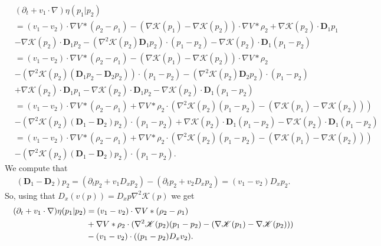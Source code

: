 \documentclass[11pt,reqno]{amsart}
\numberwithin{equation}{section}
\begin{document}
\begin{align*}
&(\partial_{t}+v_{1}\cdot \nabla)\eta(p_{1}\vert p_{2})\\
&=(v_{1}-v_{2})\cdot\nabla V\ast (\rho_{2}-\rho_{1})-(\nabla\mathscr{K}(p_{1})-\nabla\mathscr{K}(p_{2}))\cdot\nabla V\ast \rho_{2}+\nabla\mathscr{K}(p_{2})\cdot\mathbf{D}_{1}p_{1}\\
&-\nabla\mathscr{K}(p_{2})\cdot \mathbf{D}_{1}p_{2}-(\nabla^{2}\mathscr{K}(p_{2})\mathbf{D}_{1}p_{2})\cdot(p_{1}-p_{2})-\nabla\mathscr{K}(p_{2})\cdot \mathbf{D}_{1}(p_{1}-p_{2})\\
&=(v_{1}-v_{2})\cdot \nabla V\ast (\rho_{2}-\rho_{1})-(\nabla\mathscr{K}(p_{1})-\nabla\mathscr{K}(p_{2}))\cdot \nabla V\ast \rho_{2}\\
&-(\nabla^{2}\mathscr{K}(p_{2})(\mathbf{D}_{1}p_{2}-\mathbf{D}_{2}p_{2}))\cdot (p_{1}-p_{2})-(\nabla^{2}\mathscr{K}(p_{2})\mathbf{D}_{2}p_{2})\cdot (p_{1}-p_{2})\\
&+\nabla\mathscr{K}(p_{2})\cdot\mathbf{D}_{1}p_{1}-\nabla\mathscr{K}(p_{2})\cdot \mathbf{D}_{1}p_{2}-\nabla\mathscr{K}(p_{2})\cdot \mathbf{D}_{1}(p_{1}-p_{2})\\
&=(v_{1}-v_{2})\cdot\nabla V\ast (\rho_{2}-\rho_{1})+\nabla V\ast \rho_{2}\cdot \left(\nabla^{2}\mathscr{K}(p_{2})(p_{1}-p_{2})-(\nabla\mathscr{K}(p_{1})-\nabla\mathscr{K}(p_{2}))\right)\\
&-
(\nabla^{2}\mathscr{K}(p_{2})(\mathbf{D}_{1}-\mathbf{D}_{2})p_{2})\cdot (p_{1}-p_{2})+\nabla \mathscr{K}(p_{2})\cdot \mathbf{D}_{1}(p_{1}-p_{2})-\nabla \mathscr{K}(p_{2})\cdot \mathbf{D}_{1}(p_{1}-p_{2})\\
&=(v_{1}-v_{2})\cdot \nabla V\ast (\rho_{2}-\rho_{1})+\nabla V\ast \rho_{2}\cdot (\nabla^{2}\mathscr{K}(p_{2})(p_{1}-p_{2})-(\nabla \mathscr{K}(p_{1})-\nabla \mathscr{K}(p_{2})))\\
&-(\nabla^{2} \mathscr{K}(p_{2})(\mathbf{D}_{1}-\mathbf{D}_{2})p_{2})\cdot (p_{1}-p_{2}). 
\end{align*}
We compute that 
\begin{align*}
(\mathbf{D}_{1}-\mathbf{D}_{2})p_{2}=(\partial_{t}p_{2}+v_{1}D_{x}p_{2})-(\partial_{t}p_{2}+v_{2}D_{x}p_{2})=(v_{1}-v_{2})D_{x}p_{2}.     
\end{align*}
So, using that $D_{x}(v(p))=D_{x}p\nabla^{2}\mathscr{K}(p)$ we get 
\begin{align}
(\partial_{t}+v_{1}\cdot \nabla)\eta(p_{1}\vert p_{2})&=(v_{1}-v_{2})\cdot \nabla V\ast (\rho_{2}-\rho_{1}) \notag\\
&+\nabla V\ast \rho_{2}\cdot (\nabla ^{2}\mathscr{K}(p_{2})(p_{1}-p_{2})-(\nabla \mathscr{K}(p_{1})-\nabla \mathscr{K}(p_{2}))) \notag\\
&-(v_{1}-v_{2})\cdot ((p_{1}-p_{2})D_{x}v_{2}). \label{material der of eta}
\end{align}
\end{document}
